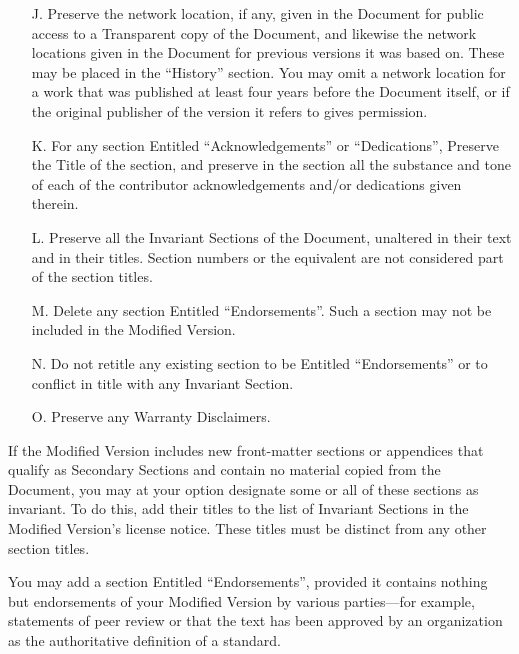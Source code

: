 \documentclass[letterpaper,twoside]{scrartcl}
\begin{document}
\begin{itemize}
   \item[J.]
    Preserve the network location, if any, given in the Document for
    public access to a Transparent copy of the Document, and likewise
    the network locations given in the Document for previous versions
    it was based on.  These may be placed in the ``History'' section.
    You may omit a network location for a work that was published at
    least four years before the Document itself, or if the original
    publisher of the version it refers to gives permission.
																	  
   \item[K.]
    For any section Entitled ``Acknowledgements'' or ``Dedications'',
    Preserve the Title of the section, and preserve in the section all
    the substance and tone of each of the contributor acknowledgements
    and/or dedications given therein.
																			 
   \item[L.]
    Preserve all the Invariant Sections of the Document,
    unaltered in their text and in their titles.  Section numbers
    or the equivalent are not considered part of the section titles.
																	 
    \item[M.]
    Delete any section Entitled ``Endorsements''.  Such a section
    may not be included in the Modified Version.
																			  
   \item[N.]
    Do not retitle any existing section to be Entitled ``Endorsements''
    or to conflict in title with any Invariant Section.
      
   \item[O.]
    Preserve any Warranty Disclaimers.
  \end{itemize}

   If the Modified Version includes new front-matter sections or
   appendices that qualify as Secondary Sections and contain no material
   copied from the Document, you may at your option designate some or all
   of these sections as invariant.  To do this, add their titles to the
   list of Invariant Sections in the Modified Version's license notice.
   These titles must be distinct from any other section titles.

   You may add a section Entitled ``Endorsements'', provided it contains
   nothing but endorsements of your Modified Version by various
   parties---for example, statements of peer review or that the text has
   been approved by an organization as the authoritative definition of a
   standard.
\end{document}
